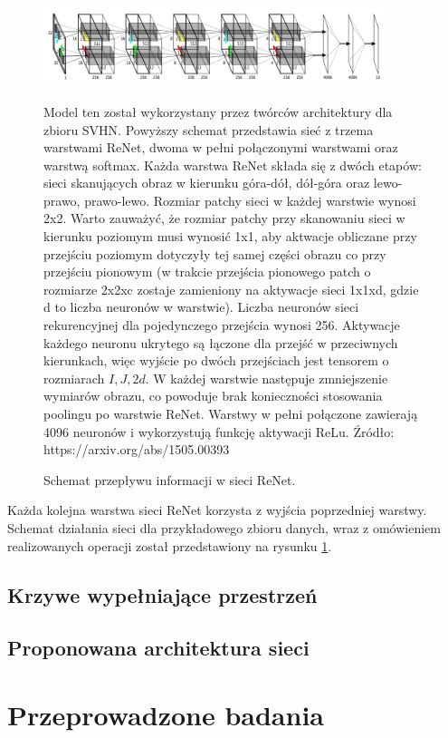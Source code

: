 \documentclass[oneside, mag]{mgr}
\begin{document}
\begin{figure}
\centering
	\includegraphics[width=0.9\textwidth]{img/ReNetArch.png}
	\caption{Schemat przepływu informacji w sieci ReNet.} Model ten został wykorzystany przez twórców architektury dla zbioru SVHN. Powyższy schemat przedstawia sieć z trzema warstwami ReNet, dwoma w pełni połączonymi warstwami oraz warstwą softmax. Każda warstwa ReNet składa się z dwóch etapów: sieci skanujących obraz w kierunku góra-dół, dół-góra oraz lewo-prawo, prawo-lewo. Rozmiar patchy sieci w każdej warstwie wynosi 2x2. Warto zauważyć, że rozmiar patchy przy skanowaniu sieci w kierunku poziomym musi wynosić 1x1, aby aktwacje obliczane przy przejściu poziomym dotyczyły tej samej części obrazu co przy przejściu pionowym (w trakcie przejścia pionowego patch o rozmiarze 2x2xc zostaje zamieniony na aktywacje sieci 1x1xd, gdzie d to liczba neuronów w warstwie). Liczba neuronów sieci rekurencyjnej dla pojedynczego przejścia wynosi 256. Aktywacje każdego neuronu ukrytego są łączone dla przejść w przeciwnych kierunkach, więc wyjście po dwóch przejściach jest tensorem o rozmiarach $I,J,2d$. W każdej warstwie następuje zmniejszenie wymiarów obrazu, co powoduje brak konieczności stosowania poolingu po warstwie ReNet. Warstwy w pełni połączone zawierają 4096 neuronów i wykorzystują funkcję aktywacji ReLu. Źródło: https://arxiv.org/abs/1505.00393
	\label{fig:ReNet}
\end{figure}

Każda kolejna warstwa sieci ReNet korzysta z wyjścia poprzedniej warstwy. Schemat działania sieci dla przykładowego zbioru danych, wraz z omówieniem realizowanych operacji został przedstawiony na rysunku \ref{fig:ReNet}.

\section{Krzywe wypełniające przestrzeń}

\section{Proponowana architektura sieci}



\chapter{Przeprowadzone badania}
\end{document}
